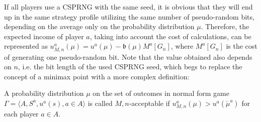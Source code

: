 If all players use a CSPRNG with the same seed, it is obvious that they will end up in the same strategy profile utilizing the same number of pseudo-random bits, depending on the average only on the probability distribution $\mu$. Therefore, the expected income of player $a$, taking into account the cost of calculations, can be represented as $u_{M,n}^a(\mu) = u^a(\mu) - \mathfrak{b}(\mu) M^a[G_n]$, where $M^a[G_n]$ is the cost of generating one pseudo-random bit. Note that the value obtained also depends on $n$, i.e. the bit length of the used CSPRNG seed, which begs to replace the concept of a minimax point with a more complex definition: %

\begin{definition}
	A probability distribution $\mu$ on the set of outcomes in normal form game $\Gamma = \langle A, S^a, u^a(s), a \in A \rangle$ is called $M,n$-acceptable if $u_{M,n}^a(\mu) > u^a(\check{\mu}^a)$ for each player $a \in A$. %
\end{definition}

